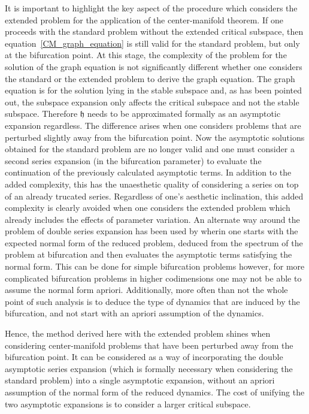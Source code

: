 It is important to highlight the key aspect of the procedure which considers the extended problem for the application of the center-manifold theorem. If one proceeds with the standard problem without the extended critical subspace, then equation~\eqref{CM_graph_equation} is still valid for the standard problem, but only at the bifurcation point. At this stage, the complexity of the problem for the solution of the graph equation is not significantly different whether one considers the standard or the extended problem to derive the graph equation. The graph equation is for the solution lying in the stable subspace and, as has been pointed out, the subspace expansion only affects the critical subspace and not the stable subspace. Therefore $\mathfrak{h}$ needs to be approximated formally as an asymptotic expansion regardless. The difference arises when one considers problems that are perturbed slightly away from the bifurcation point. Now the asymptotic solutions obtained for the standard problem are no longer valid and one must consider a second series expansion (in the bifurcation parameter) to evaluate the continuation of the previously calculated asymptotic terms. In addition to the added complexity, this has the unaesthetic quality of considering a series on top of an already trucated series. Regardless of one's aesthetic inclination, this added complexity is clearly avoided when one considers the extended problem which already includes the effects of parameter variation. An alternate way around the problem of double series expansion has been used by \cite{haragus11} wherin one starts with the expected normal form of the reduced problem, deduced from the spectrum of the problem at bifurcation and then evaluates the asymptotic terms satisfying the normal form. This can be done for simple bifurcation problems however, for more complicated bifurcation problems in higher codimensions one may not be able to assume the normal form apriori. Additionally, more often than not the whole point of such analysis is to deduce the type of dynamics that are induced by the bifurcation, and not start with an apriori assumption of the dynamics. 

Hence, the method derived here with the extended problem shines when considering center-manifold problems that have been perturbed away from the bifurcation point. It can be considered as a way of incorporating the double asymptotic series expansion (which is formally necessary when considering the standard problem) into a single asymptotic expansion, without an apriori assumption of the normal form of the reduced dynamics. The cost of unifying the two asymptotic expansions is to consider a larger critical subspace. 









